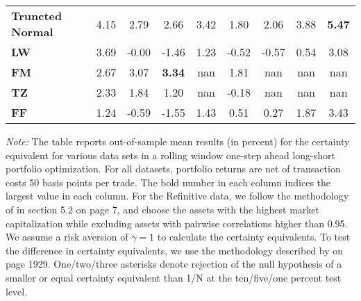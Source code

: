 \begin{table}[p]
{\begin{tabularx}{\textwidth}{Xcccccccc}
\textbf{Truncted Normal} & \cellcolor{gray!36}4.15 & \cellcolor{gray!27}2.79 & \cellcolor{gray!27}2.66 & \cellcolor{gray!36}3.42 & \cellcolor{gray!27}1.80 & \cellcolor{gray!36}2.06 & \cellcolor{gray!40}3.88 & \cellcolor{gray!45}\textbf{5.47} \\
\textbf{LW} & \cellcolor{gray!27}3.69 & \cellcolor{gray!18}-0.00 & \cellcolor{gray!9}-1.46 & \cellcolor{gray!27}1.23 & \cellcolor{gray!4}-0.52 & \cellcolor{gray!27}-0.57 & \cellcolor{gray!27}0.54 & \cellcolor{gray!27}3.08 \\
\textbf{FM} & \cellcolor{gray!22}2.67 & \cellcolor{gray!31}3.07 & \cellcolor{gray!43}\textbf{3.34} & \cellcolor{gray!0}nan & \cellcolor{gray!31}1.81 & \cellcolor{gray!0}nan & \cellcolor{gray!0}nan & \cellcolor{gray!0}nan \\
\textbf{TZ} & \cellcolor{gray!18}2.33 & \cellcolor{gray!22}1.84 & \cellcolor{gray!22}1.20 & \cellcolor{gray!0}nan & \cellcolor{gray!9}-0.18 & \cellcolor{gray!0}nan & \cellcolor{gray!0}nan & \cellcolor{gray!0}nan \\
\textbf{FF} & \cellcolor{gray!0}1.24 & \cellcolor{gray!4}-0.59 & \cellcolor{gray!4}-1.55 & \cellcolor{gray!31}1.43 & \cellcolor{gray!22}0.51 & \cellcolor{gray!31}0.27 & \cellcolor{gray!31}1.87 & \cellcolor{gray!31}3.43 \\
\bottomrule
\end{tabularx}
\vspace{0.3em}
{\footnotesize \textit{Note:} The table reports out-of-sample mean results (in percent) for the certainty equivalent for various data sets in a rolling window one-step ahead long-short portfolio optimization. For all datasets, portfolio returns are net of transaction costs 50 basis points per trade. The bold number in each column indices the largest value in each column. For the Refinitive data, we follow the methodology of \citet{denard2022} in section 5.2 on page 7, and choose the assets with the highest market capitalization while excluding assets with pairwise correlations higher than 0.95. We assume a risk aversion of $\gamma=1$ to calculate the certainty equivalents. To test the difference in certainty equivalents, we use the methodology described by \citet{demiguel2009} on page 1929. One/two/three asterisks denote rejection of the null hypothesis of a smaller or equal certainty equivalent than 1/N at the ten/five/one percent test level.}}
\end{table}
